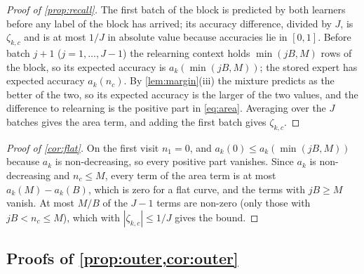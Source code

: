 \documentclass[11pt]{article}
\theoremstyle{plain}
\theoremstyle{definition}
\theoremstyle{remark}
\begin{document}
\begin{proof}[Proof of \cref{prop:recall}]
The first batch of the block is predicted by both learners before any label of the block has arrived; its
accuracy difference, divided by $J$, is $\zeta_{k,c}$ and is at most $1/J$ in absolute value because
accuracies lie in $[0,1]$. Before batch $j+1$
($j=1,\dots,J-1$) the relearning context holds $\min(jB,M)$ rows of the block, so its expected accuracy is
$a_k(\min(jB,M))$; the stored expert has expected accuracy $a_k(n_c)$. By \cref{lem:margin}(iii) the mixture
predicts as the better of the two, so its expected accuracy is the larger of the two values, and the difference to
relearning is the positive part in \eqref{eq:area}. Averaging over the $J$ batches gives the area term, and adding
the first batch gives $\zeta_{k,c}$.
\end{proof}

\begin{proof}[Proof of \cref{cor:flat}]
On the first visit $n_1=0$, and $a_k(0)\le a_k(\min(jB,M))$ because $a_k$ is non-decreasing, so every positive part
vanishes. Since $a_k$ is non-decreasing and $n_c\le M$, every term of the area term is at most $a_k(M)-a_k(B)$, which
is zero for a flat curve, and the terms with $jB\ge M$ vanish. At most $M/B$ of the $J-1$ terms are non-zero (only those with $jB<n_c\le M$),
which with $|\zeta_{k,c}|\le1/J$ gives the bound.
\end{proof}

\subsection{Proofs of \texorpdfstring{\cref{prop:outer,cor:outer}}{Theorem 2 and Corollary 3}}
\end{document}
